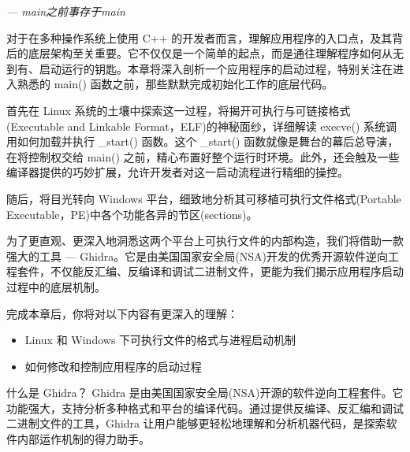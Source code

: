 
\begin{flushright}
\textit{--- main之前事存于main}
\end{flushright}

对于在多种操作系统上使用 C++ 的开发者而言，理解应用程序的入口点，及其背后的底层架构至关重要。它不仅仅是一个简单的起点，而是通往理解程序如何从无到有、启动运行的钥匙。本章将深入剖析一个应用程序的启动过程，特别关注在进入熟悉的 main() 函数之前，那些默默完成初始化工作的底层代码。

首先在 Linux 系统的土壤中探索这一过程，将揭开可执行与可链接格式(Executable and Linkable Format，ELF)的神秘面纱，详细解读 execve() 系统调用如何加载并执行 \_start() 函数。这个 \_start() 函数就像是舞台的幕后总导演，在将控制权交给 main() 之前，精心布置好整个运行时环境。此外，还会触及一些编译器提供的巧妙扩展，允许开发者对这一启动流程进行精细的操控。

随后，将目光转向 Windows 平台，细致地分析其可移植可执行文件格式(Portable Executable，PE)中各个功能各异的节区(sections)。

为了更直观、更深入地洞悉这两个平台上可执行文件的内部构造，我们将借助一款强大的工具 --- Ghidra。它是由美国国家安全局(NSA)开发的优秀开源软件逆向工程套件，不仅能反汇编、反编译和调试二进制文件，更能为我们揭示应用程序启动过程中的底层机制。

完成本章后，你将对以下内容有更深入的理解：

\begin{itemize}
\item 
Linux 和 Windows 下可执行文件的格式与进程启动机制

\item 
如何修改和控制应用程序的启动过程
\end{itemize}

\begin{myTip}{什么是 Ghidra？}
Ghidra 是由美国国家安全局(NSA)开源的软件逆向工程套件。它功能强大，支持分析多种格式和平台的编译代码。通过提供反编译、反汇编和调试二进制文件的工具，Ghidra 让用户能够更轻松地理解和分析机器代码，是探索软件内部运作机制的得力助手。
\end{myTip}





